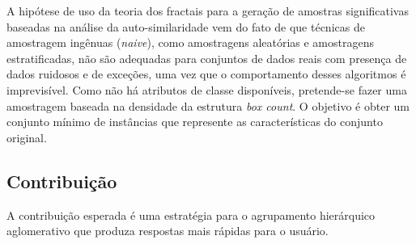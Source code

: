 A hipótese de uso da teoria dos fractais para a geração de amostras
significativas baseadas na análise da auto-similaridade vem do fato de que
técnicas de amostragem ingênuas (\textit{naive}), como amostragens aleatórias e
amostragens estratificadas, não são adequadas para conjuntos de dados reais com
presença de dados ruidosos e de exceções, uma vez que o comportamento desses
algoritmos é imprevisível.
Como não há atributos de classe disponíveis, pretende-se fazer uma amostragem
baseada na densidade da estrutura \textit{box count}. O objetivo é obter um
conjunto mínimo de instâncias que represente as características do conjunto
original.

\subsection{Contribuição}
	\label{subsec:contribuicao}

A contribuição esperada é uma estratégia para o agrupamento hierárquico
aglomerativo que produza respostas mais rápidas para o usuário.


